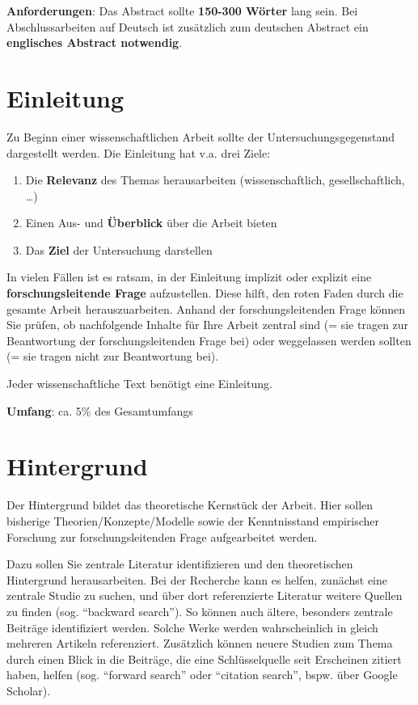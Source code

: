 \documentclass[
  letterpaper,
  DIV=11]{scrreprt}
\begin{document}
\textbf{Anforderungen}: Das Abstract sollte \textbf{150-300 Wörter} lang
sein. Bei Abschlussarbeiten auf Deutsch ist zusätzlich zum deutschen
Abstract ein \textbf{englisches Abstract notwendig}.

\hypertarget{einleitung}{%
\section{Einleitung}\label{einleitung}}

Zu Beginn einer wissenschaftlichen Arbeit sollte der
Untersuchungsgegenstand dargestellt werden. Die Einleitung hat v.a. drei
Ziele:

\begin{enumerate}
\def\labelenumi{\arabic{enumi}.}
\item
  Die \textbf{Relevanz} des Themas herausarbeiten (wissenschaftlich,
  gesellschaftlich, \ldots)
\item
  Einen Aus- und \textbf{Überblick} über die Arbeit bieten
\item
  Das \textbf{Ziel} der Untersuchung darstellen
\end{enumerate}

In vielen Fällen ist es ratsam, in der Einleitung implizit oder explizit
eine \textbf{forschungsleitende Frage} aufzustellen. Diese hilft, den
roten Faden durch die gesamte Arbeit herauszuarbeiten. Anhand der
forschungsleitenden Frage können Sie prüfen, ob nachfolgende Inhalte für
Ihre Arbeit zentral sind (= sie tragen zur Beantwortung der
forschungsleitenden Frage bei) oder weggelassen werden sollten (= sie
tragen nicht zur Beantwortung bei).

Jeder wissenschaftliche Text benötigt eine Einleitung.

\textbf{Umfang}: ca. 5\% des Gesamtumfangs

\hypertarget{hintergrund}{%
\section{Hintergrund}\label{hintergrund}}

Der Hintergrund bildet das theoretische Kernstück der Arbeit. Hier
sollen bisherige Theorien/Konzepte/Modelle sowie der Kenntnisstand
empirischer Forschung zur forschungsleitenden Frage aufgearbeitet
werden.

Dazu sollen Sie zentrale Literatur identifizieren und den theoretischen
Hintergrund herausarbeiten. Bei der Recherche kann es helfen, zunächst
eine zentrale Studie zu suchen, und über dort referenzierte Literatur
weitere Quellen zu finden (sog. ``backward search''). So können auch
ältere, besonders zentrale Beiträge identifiziert werden. Solche Werke
werden wahrscheinlich in gleich mehreren Artikeln referenziert.
Zusätzlich können neuere Studien zum Thema durch einen Blick in die
Beiträge, die eine Schlüsselquelle seit Erscheinen zitiert haben, helfen
(sog. ``forward search'' oder ``citation search'', bspw. über Google
Scholar).
\end{document}
